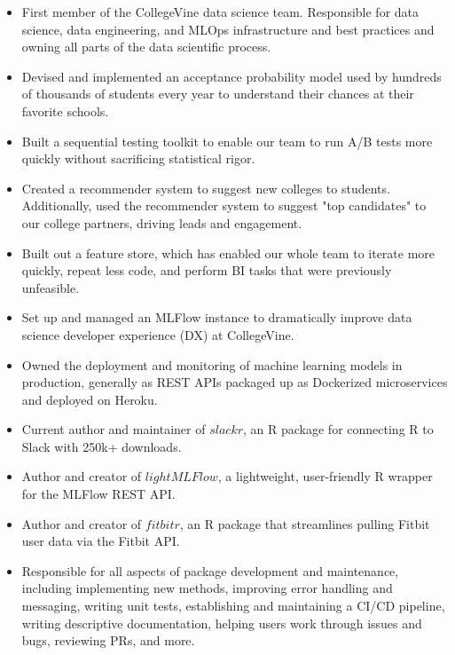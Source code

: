\documentclass[10pt,a4paper,ragged2e,withhyper]{/Users/matt/documents/GitHub/mrkaye97.github.io/resume/altacv}
\begin{document}
	


	 \makecvheader
		
	
		\begin{itemize}
		\item First member of the CollegeVine data science team.  Responsible for data science, data engineering, and MLOps infrastructure and best practices and owning all parts of the data scientific process.
		\item Devised and implemented an acceptance probability model used by hundreds of thousands of students every year to understand their chances at their favorite schools.
		\item Built a sequential testing toolkit to enable our team to run A/B tests more quickly without sacrificing statistical rigor.
		\item Created a recommender system to suggest new colleges to students. Additionally, used the recommender system to suggest "top candidates" to our college partners, driving leads and engagement.
		\item Built out a feature store, which has enabled our whole team to iterate more quickly, repeat less code, and perform BI tasks that were previously unfeasible.
		\item Set up and managed an MLFlow instance to dramatically improve data science developer experience (DX) at CollegeVine.
		\item Owned the deployment and monitoring of machine learning models in production, generally as REST APIs packaged up as Dockerized microservices and deployed on Heroku.
		\end{itemize}
		
		\divider
		
		
		\begin{itemize}
		\item Current author and maintainer of $slackr$, an R package for connecting R to Slack with 250k+ downloads.
		\item Author and creator of $lightMLFlow$, a lightweight, user-friendly R wrapper for the MLFlow REST API.
		\item Author and creator of $fitbitr$, an R package that streamlines pulling Fitbit user data via the Fitbit API.
		\item Responsible for all aspects of package development and maintenance, including implementing new methods, improving error handling and messaging, writing unit tests, establishing and maintaining a CI/CD pipeline, writing descriptive documentation, helping users work through issues and bugs, reviewing PRs, and more.
		\end{itemize}
		
\end{document}
